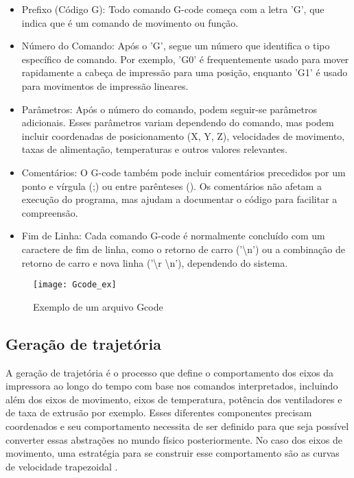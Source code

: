 \begin{itemize}
    \item Prefixo (Código G): Todo comando G-code começa com a letra 'G', que indica que é um comando de movimento ou função.
    \item Número do Comando: Após o 'G', segue um número que identifica o tipo específico de comando. Por exemplo, 'G0' é frequentemente usado para mover rapidamente a cabeça de impressão para uma posição, enquanto 'G1' é usado para movimentos de impressão lineares.
    \item Parâmetros: Após o número do comando, podem seguir-se parâmetros adicionais. Esses parâmetros variam dependendo do comando, mas podem incluir coordenadas de posicionamento (X, Y, Z), velocidades de movimento, taxas de alimentação, temperaturas e outros valores relevantes.
    \item Comentários: O G-code também pode incluir comentários precedidos por um ponto e vírgula (;) ou entre parênteses (). Os comentários não afetam a execução do programa, mas ajudam a documentar o código para facilitar a compreensão.
    \item Fim de Linha: Cada comando G-code é normalmente concluído com um caractere de fim de linha, como o retorno de carro ('\textbackslash n') ou a combinação de retorno de carro e nova linha ('\textbackslash r \textbackslash n'), dependendo do sistema.
\end{itemize}

\begin{figure}[H]
    \centering
    \caption{Exemplo de um arquivo Gcode}
    \texttt{[image: Gcode\_ex]}
    \label{fig:gcode_ex}
\end{figure}

\subsection{Geração de trajetória}
A geração de trajetória é o processo que define o comportamento dos eixos da impressora ao longo do tempo com base nos comandos interpretados, incluindo além dos eixos de movimento, eixos de temperatura, potência dos ventiladores e de taxa de extrusão por exemplo. Esses diferentes componentes precisam coordenados e seu comportamento necessita de ser definido para que seja possível converter essas abstrações no mundo físico posteriormente. No caso dos eixos de movimento, uma estratégia para se construir esse comportamento são as curvas de velocidade trapezoidal \cite{yu20}. 

